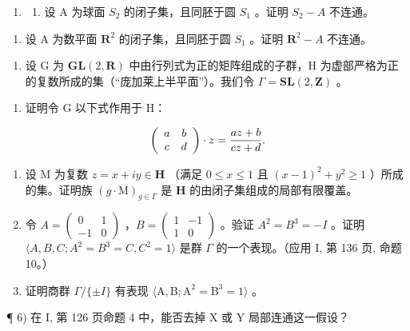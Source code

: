 \begin{enumerate}
\def\labelenumi{\arabic{enumi})}
\setcounter{enumi}{3}
\tightlist
\item
  \begin{enumerate}
  \def\labelenumii{\alph{enumii})}
  \tightlist
  \item
    设 A 为球面 \(S_{2}\) 的闭子集，且同胚于圆 \(S_{1}\) 。证明 \(S_{2}-A\) 不连通。
  \end{enumerate}
\end{enumerate}

\begin{enumerate}
\def\labelenumi{\alph{enumi})}
\setcounter{enumi}{1}
\tightlist
\item
  设 A 为数平面 \(\mathbf{R}^{2}\) 的闭子集，且同胚于圆 \(S_{1}\) 。证明 \(\mathbf{R}^{2}-A\) 不连通。
\end{enumerate}

\begin{enumerate}
\def\labelenumi{\arabic{enumi})}
\setcounter{enumi}{4}
\tightlist
\item
  设 G 为 \(\mathbf{GL}(2,\mathbf{R})\) 中由行列式为正的矩阵组成的子群，H 为虚部严格为正的复数所成的集（“庞加莱上半平面”）。我们令 \(\Gamma = \mathbf{SL}(2,\mathbf{Z})\) 。
\end{enumerate}

\begin{enumerate}
\def\labelenumi{\alph{enumi})}
\tightlist
\item
  证明令 G 以下式作用于 H：
\end{enumerate}

\[
\left( \begin{array}{c c} a & b \\ c & d \end{array} \right) \cdot z = \frac {a z + b}{c z + d}.
\]

\begin{enumerate}
\def\labelenumi{\alph{enumi})}
\setcounter{enumi}{1}
\item
  设 M 为复数 \(z = x + iy \in \mathbf{H}\) （满足 \(0 \leqslant x \leqslant 1\) 且 \((x - 1)^2 + y^2 \geqslant 1\) ）所成的集。证明族 \((g \cdot \mathrm{M})_{g \in \Gamma}\) 是 \(\mathbf{H}\) 的由闭子集组成的局部有限覆盖。
\item
  令 \(A = \begin{pmatrix} 0 & 1 \\ -1 & 0 \end{pmatrix}\) ，\(B = \begin{pmatrix} 1 & -1 \\ 1 & 0 \end{pmatrix}\) 。验证 \(A^{2} = B^{3} = -I\) 。证明 \(\langle A, B, C; A^{2} = B^{3} = C, C^{2} = 1 \rangle\) 是群 \(\Gamma\) 的一个表现。（应用 I, 第 136 页, 命题 10。）
\item
  证明商群 \(\Gamma/\{\pm I\}\) 有表现 \(\langle\mathrm{A},\mathrm{B};\mathrm{A}^{2}=\mathrm{B}^{3}=1\rangle\) 。
\end{enumerate}

¶ 6) 在 I, 第 126 页命题 4 中，能否去掉 X 或 Y 局部连通这一假设？

